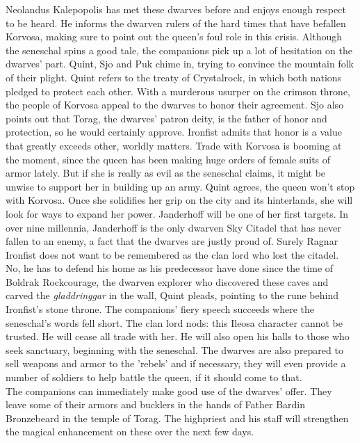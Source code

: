 Neolandus Kalepopolis has met these dwarves before and enjoys enough respect to be heard. He informs the dwarven rulers of the hard times that have befallen Korvosa, making sure to point out the queen's foul role in this crisis. Although the seneschal spins a good tale, the companions pick up a lot of hesitation on the dwarves' part. Quint, Sjo and Puk chime in, trying to convince the mountain folk of their plight. Quint refers to the treaty of Crystalrock, in which both nations pledged to protect each other. With a murderous usurper on the crimson throne, the people of Korvosa appeal to the dwarves to honor their agreement. Sjo also points out that Torag, the dwarves' patron deity, is the father of honor and protection, so he would certainly approve. Ironfist admits that honor is a value that greatly exceeds other, worldly matters. Trade with Korvosa is booming at the moment, since the queen has been making huge orders of female suits of armor lately. But if she is really as evil as the seneschal claims, it might be unwise to support her in building up an army. Quint agrees, the queen won't stop with Korvosa. Once she solidifies her grip on the city and its hinterlands, she will look for ways to expand her power. Janderhoff will be one of her first targets. In over nine millennia, Janderhoff is the only dwarven Sky Citadel that has never fallen to an enemy, a fact that the dwarves are justly proud of. Surely Ragnar Ironfist does not want to be remembered as the clan lord who lost the citadel. No, he has to defend his home as his predecessor have done since the time of Boldrak Rockcourage, the dwarven explorer who discovered these caves and carved the {\itshape gladdringgar} in the wall, Quint pleads, pointing to the rune behind Ironfist's stone throne. The companions' fiery speech succeeds where the seneschal's words fell short. The clan lord nods: this Ileosa character cannot be trusted. He will cease all trade with her. He will also open his halls to those who seek sanctuary, beginning with the seneschal. The dwarves are also prepared to sell weapons and armor to the 'rebels' and if necessary, they will even provide a number of soldiers to help battle the queen, if it should come to that.\\

The companions can immediately make good use of the dwarves' offer. They leave some of their armors and bucklers in the hands of Father Bardin Bronzebeard in the temple of Torag. The highpriest and his staff will strengthen the magical enhancement on these over the next few days.\\

